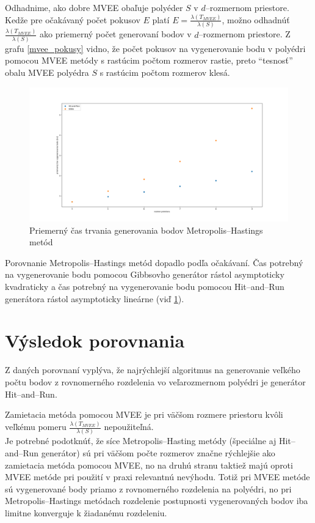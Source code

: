 Odhadnime, ako dobre MVEE obaľuje polyéder $S$ v $d$--rozmernom priestore. Kedže pre očakávaný počet pokusov $E$ platí $E=\frac{\lambda(T_{MVEE})}{\lambda(S)}$, možno odhadnúť $\frac{\lambda(T_{MVEE})}{\lambda(S)}$ ako priemerný počet generovaní bodov v $d$--rozmernom priestore. Z grafu \ref{mvee_pokusy} vidno, že počet pokusov na vygenerovanie bodu v polyédri pomocou MVEE metódy s rastúcim počtom rozmerov rastie, preto ``tesnosť'' obalu MVEE polyédra $S$ s rastúcim počtom rozmerov klesá.

\begin{figure} 
  \includegraphics[width=\linewidth]{images/mh.png}
  \caption{Priemerný čas trvania generovania bodov Metropolis--Hastings metód}
  \label{fig:mh}
\end{figure}

Porovnanie Metropolis--Hastings metód dopadlo podľa očakávaní. Čas potrebný na vygenerovanie bodu pomocou Gibbsovho generátor rástol asymptoticky kvadraticky a čas potrebný na vygenerovanie bodu pomocou Hit--and--Run generátora rástol asymptoticky lineárne (viď \ref{fig:mh}).\\

\section{Výsledok porovnania}

Z daných porovnaní vyplýva, že najrýchlejší algoritmus na generovanie veľkého počtu bodov z rovnomerného rozdelenia vo veľarozmernom polyédri je generátor Hit--and--Run.

Zamietacia metóda pomocou MVEE je pri väčšom rozmere priestoru kvôli veľkému pomeru $\frac{\lambda(T_{MVEE})}{\lambda(S)}$ nepoužiteľná.\\

Je potrebné podotknúť, že síce Metropolis--Hasting metódy (špeciálne aj Hit--and--Run generátor) sú pri väčšom počte rozmerov značne rýchlejšie ako zamietacia metóda pomocou MVEE, no na druhú stranu taktiež majú oproti MVEE metóde pri použití v praxi relevantnú nevýhodu. Totiž pri MVEE metóde sú vygenerované body priamo z rovnomerného rozdelenia na polyédri, no pri Metropolis--Hastings metódach rozdelenie postupnosti vygenerovaných bodov iba limitne konverguje k žiadanému rozdeleniu.

